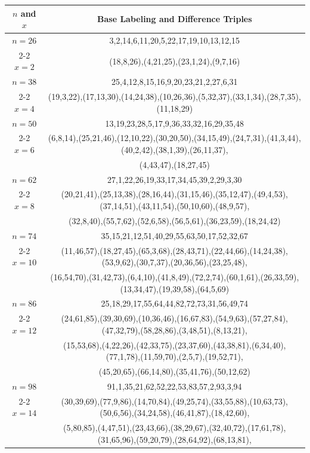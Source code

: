 \begin{tabular}{| c | c |}
\hline
\(n\) and \(x\) & Base Labeling and Difference Triples\\
\hline
\(n=26\) & 
3,2,14,6,11,20,5,22,17,19,10,13,12,15\\
\cline{2-2}
\(x=2\)
&(18,8,26),(4,21,25),(23,1,24),(9,7,16)\\
\hline 
\(n=38\) & 
25,4,12,8,15,16,9,20,23,21,2,27,6,31\\
\cline{2-2}
\(x=4\)
&(19,3,22),(17,13,30),(14,24,38),(10,26,36),(5,32,37),(33,1,34),(28,7,35),(11,18,29)\\
\hline 
\(n=50\) & 
13,19,23,28,5,17,9,36,33,32,16,29,35,48\\
\cline{2-2}
\(x=6\)
&(6,8,14),(25,21,46),(12,10,22),(30,20,50),(34,15,49),(24,7,31),(41,3,44),(40,2,42),(38,1,39),(26,11,37),\\
&(4,43,47),(18,27,45)\\
\hline 
\(n=62\) & 
27,1,22,26,19,33,17,34,45,39,2,29,3,30\\
\cline{2-2}
\(x=8\)
&(20,21,41),(25,13,38),(28,16,44),(31,15,46),(35,12,47),(49,4,53),(37,14,51),(43,11,54),(50,10,60),(48,9,57),\\
&(32,8,40),(55,7,62),(52,6,58),(56,5,61),(36,23,59),(18,24,42)\\
\hline 
\(n=74\) & 
35,15,21,12,51,40,29,55,63,50,17,52,32,67\\
\cline{2-2}
\(x=10\)
&(11,46,57),(18,27,45),(65,3,68),(28,43,71),(22,44,66),(14,24,38),(53,9,62),(30,7,37),(20,36,56),(23,25,48),\\
&(16,54,70),(31,42,73),(6,4,10),(41,8,49),(72,2,74),(60,1,61),(26,33,59),(13,34,47),(19,39,58),(64,5,69)\\
\hline 
\(n=86\) & 
25,18,29,17,55,64,44,82,72,73,31,56,49,74\\
\cline{2-2}
\(x=12\)
&(24,61,85),(39,30,69),(10,36,46),(16,67,83),(54,9,63),(57,27,84),(47,32,79),(58,28,86),(3,48,51),(8,13,21),\\
&(15,53,68),(4,22,26),(42,33,75),(23,37,60),(43,38,81),(6,34,40),(77,1,78),(11,59,70),(2,5,7),(19,52,71),\\
&(45,20,65),(66,14,80),(35,41,76),(50,12,62)\\
\hline 
\(n=98\) & 
91,1,35,21,62,52,22,53,83,57,2,93,3,94\\
\cline{2-2}
\(x=14\)
&(30,39,69),(77,9,86),(14,70,84),(49,25,74),(33,55,88),(10,63,73),(50,6,56),(34,24,58),(46,41,87),(18,42,60),\\
&(5,80,85),(4,47,51),(23,43,66),(38,29,67),(32,40,72),(17,61,78),(31,65,96),(59,20,79),(28,64,92),(68,13,81),\\

\end{tabular}
